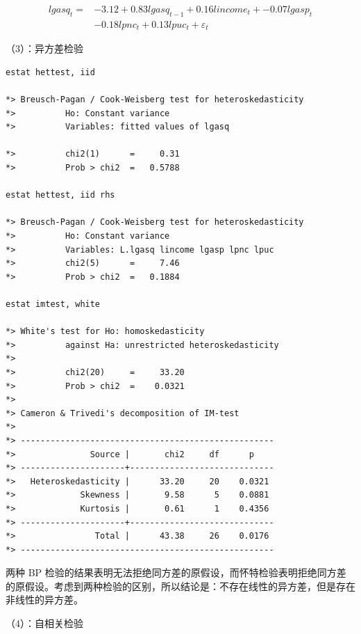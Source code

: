 \documentclass[cn,fancy,blue,11pt]{elegantbook}
\begin{document}
\begin{align}
lgasq_t =& -3.12 + 0.83 lgasq_{t-1} + 0.16lincome_t + -0.07lgasp_t \\
& - 0.18lpnc_t + 0.13lpuc_t + \varepsilon_t
\end{align}

（3）：异方差检验

\begin{lstlisting}
estat hettest, iid

*> Breusch-Pagan / Cook-Weisberg test for heteroskedasticity
*>          Ho: Constant variance
*>          Variables: fitted values of lgasq

*>          chi2(1)      =     0.31
*>          Prob > chi2  =   0.5788

estat hettest, iid rhs

*> Breusch-Pagan / Cook-Weisberg test for heteroskedasticity
*>          Ho: Constant variance
*>          Variables: L.lgasq lincome lgasp lpnc lpuc
*>          chi2(5)      =     7.46
*>          Prob > chi2  =   0.1884

estat imtest, white

*> White's test for Ho: homoskedasticity
*>          against Ha: unrestricted heteroskedasticity
*>
*>          chi2(20)     =     33.20
*>          Prob > chi2  =    0.0321
*>
*> Cameron & Trivedi's decomposition of IM-test
*>
*> ---------------------------------------------------
*>               Source |       chi2     df      p
*> ---------------------+-----------------------------
*>   Heteroskedasticity |      33.20     20    0.0321
*>             Skewness |       9.58      5    0.0881
*>             Kurtosis |       0.61      1    0.4356
*> ---------------------+-----------------------------
*>                Total |      43.38     26    0.0176
*> ---------------------------------------------------
\end{lstlisting}

两种 BP 检验的结果表明无法拒绝同方差的原假设，而怀特检验表明拒绝同方差的原假设。考虑到两种检验的区别，所以结论是：不存在线性的异方差，但是存在非线性的异方差。

（4）：自相关检验
\end{document}
